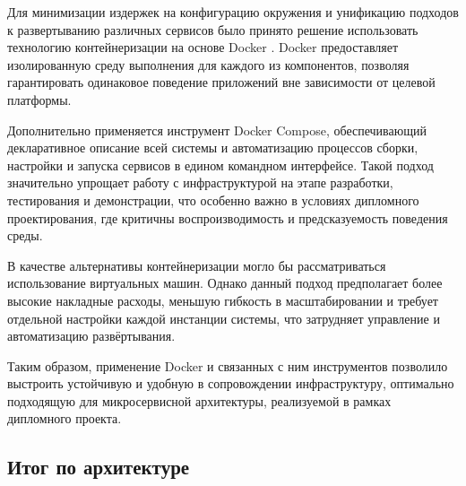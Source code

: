 Для минимизации издержек на конфигурацию окружения и унификацию подходов
к развертыванию различных сервисов было принято решение
использовать технологию контейнеризации на основе Docker \cite{Docker}.
Docker предоставляет изолированную среду выполнения
для каждого из компонентов, позволяя гарантировать
одинаковое поведение приложений вне зависимости от целевой платформы.

Дополнительно применяется инструмент Docker Compose,
обеспечивающий декларативное описание всей системы
и автоматизацию процессов сборки, настройки и запуска сервисов
в едином командном интерфейсе.
Такой подход значительно упрощает работу с инфраструктурой
на этапе разработки, тестирования и демонстрации,
что особенно важно в условиях дипломного проектирования,
где критичны воспроизводимость и предсказуемость поведения среды.

В качестве альтернативы контейнеризации
могло бы рассматриваться использование виртуальных машин.
Однако данный подход предполагает более высокие накладные расходы,
меньшую гибкость в масштабировании
и требует отдельной настройки каждой инстанции системы,
что затрудняет управление и автоматизацию развёртывания.

Таким образом, применение Docker и связанных с ним инструментов
позволило выстроить устойчивую и удобную в сопровождении инфраструктуру,
оптимально подходящую для микросервисной архитектуры,
реализуемой в рамках дипломного проекта.

\subsection{Итог по архитектуре}

\begin{table}[h!]
\centering
\caption{Архитектурные решения и обоснование выбора}
\end{table}


